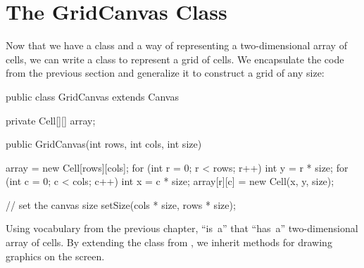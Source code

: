 %
%
%


\section{The GridCanvas Class}

Now that we have a  class and a way of representing a two-dimensional array of cells, we can write a class to represent a grid of cells.
We encapsulate the code from the previous section and generalize it to construct a grid of any size:

\begin{code}
public class GridCanvas extends Canvas {
    private Cell[][] array;

    public GridCanvas(int rows, int cols, int size) {
        array = new Cell[rows][cols];
        for (int r = 0; r < rows; r++) {
            int y = r * size;
            for (int c = 0; c < cols; c++) {
                int x = c * size;
                array[r][c] = new Cell(x, y, size);
            }
        }

        // set the canvas size
        setSize(cols * size, rows * size);
    }
}
\end{code}


Using vocabulary from the previous chapter,  ``is~a''  that ``has~a'' two-dimensional array of cells.
By extending the  class from , we inherit methods for drawing graphics on the screen.

